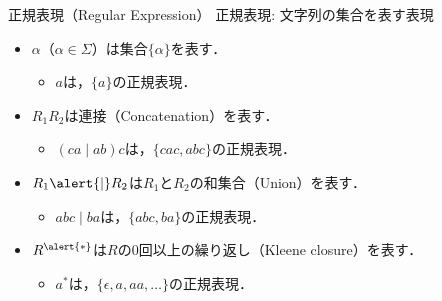 \documentclass[dvipdfmx,12pt,beamer]{standalone}
\begin{document}
\begin{frame}{正規表現（Regular Expression）} 
  \alert{正規表現}: 文字列の集合を表す表現\\
	\begin{itemize}
    \item $\alpha$（$\alpha \in \Sigma$）は集合$\{\alpha\}$を表す．
			\begin{itemize}
        \item $a$は，$\{a\}$の正規表現．
			\end{itemize}
		\item $R_1R_2$は連接（Concatenation）を表す．
			\begin{itemize}
				\item $(ca\mid ab)c$は，$\{cac, abc\}$の正規表現．
			\end{itemize}
    \item $R_1\alert{\mid}R_2$は$R_1$と$R_2$の和集合（Union）を表す．
			\begin{itemize}
				\item $abc\mid ba$は，$\{abc, ba\}$の正規表現．
			\end{itemize}
    \item $R^{\alert{*}}$は$R$の$0$回以上の繰り返し（Kleene closure）を表す．
			\begin{itemize}
				\item $a^*$は，$\{\epsilon, a, aa, \ldots\}$の正規表現．
			\end{itemize}
	\end{itemize}
\end{frame}
\end{document}
